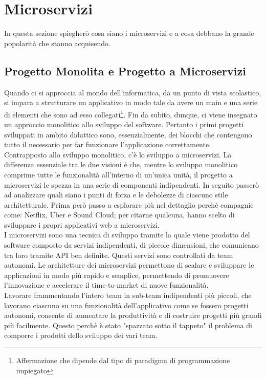 \section{Microservizi}
In questa sezione spiegherò cosa siano i microservizi e a cosa debbano la grande popolarità che stanno acquisendo.

\subsection{Progetto Monolita e Progetto a Microservizi}
Quando ci si approccia al mondo dell'informatica, da un punto di vista scolastico, si impara a strutturare un applicativo in modo tale da avere un main e una serie di elementi che sono ad esso collegati\footnote{Affermazione che dipende dal tipo di paradigma di programmazione impiegato}. Fin da subito, dunque, ci viene insegnato un approccio monolitico allo sviluppo del software. Pertanto i primi progetti sviluppati in ambito didattico sono, essenzialmente, dei blocchi che contengono tutto il necessario per far funzionare l'applicazione correttamente.
\\
Contrapposto allo sviluppo monolitico, c'è lo sviluppo a microservizi. La differenza essenziale tra le due visioni è che, mentre lo sviluppo monolitico comprime tutte le funzionalità all'interno di un'unica unità, il progetto a microservizi le spezza in una serie di componenti indipendenti. In seguito passerò ad analizzare quali siano i punti di forza e le debolezze di ciascuno stile architetturale. Prima però passo a esplorare più nel dettaglio perché compagnie come: Netflix, Uber e Sound Cloud; per citarne qualcuna, hanno scelto di sviluppare i propri applicativi web a microservizi.
\\
I microservizi sono una tecnica di sviluppo tramite la quale viene prodotto del software composto da  servizi indipendenti, di piccole dimensioni, che comunicano tra loro tramite API ben definite. Questi servizi sono controllati da team autonomi. Le architetture dei microservizi permettono di scalare e sviluppare le applicazioni in modo più rapido e semplice, permettendo di promuovere l’innovazione e accelerare il time-to-market di nuove funzionalità.\cite{MicroserviceAmazon}
\\
Lavorare frammentando l'intero team in sub-team indipendenti più piccoli, che lavorano ciascuno su una funzionalità dell'applicativo come se fossero progetti autonomi, consente di aumentare la produttività e di costruire progetti più grandi più facilmente. Questo perchè è stato "spazzato sotto il tappeto" il problema di comporre i prodotti dello sviluppo dei vari team.
